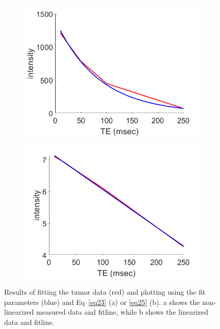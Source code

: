 \documentclass[12pt]{article}
\begin{document}
\begin{figure}[H]
	\begin{subfigure}{.5\textwidth}
		\centering
		\includegraphics[width=.95\linewidth]{tumor_nonlin.png}
		\caption{}
		\label{fig:t_nonlin}
	\end{subfigure}%
	\begin{subfigure}{.5\textwidth}
		\centering
		\includegraphics[width=.95\linewidth]{tumor_lin.png}
		\caption{}
		\label{fig:t_lin}
	\end{subfigure}
	\caption{Results of fitting the tumor data (red) and plotting using the fit parameters (blue) and Eq~\ref{eq23} (a) or \ref{eq25} (b). a shows the non-linearized measured data and fitline, while b shows the linearized data and fitline.}
	\label{fig:tumor}
\end{figure}
\end{document}
